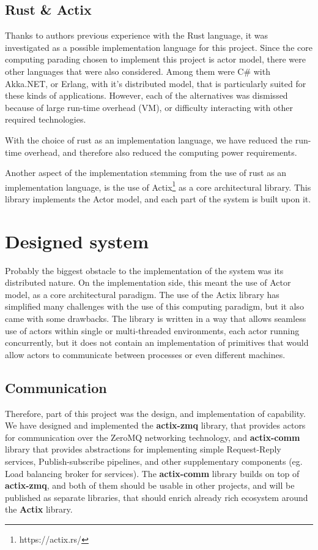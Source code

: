 \documentclass{ExcelAtFIT}
\begin{document}
    \subsection{Rust \& Actix}
    Thanks to authors previous experience with the Rust language, it was investigated as a possible implementation language for this project. Since
    the core computing parading chosen to implement this project is actor model, there were other languages that were also considered. Among them
    were C\# with Akka.NET, or Erlang, with it's distributed model, that is particularly suited for these kinds of applications. However, each of the
    alternatives was dismissed because of large run-time overhead (VM), or difficulty interacting with other required technologies.

    With the choice of rust as an implementation language, we have reduced the run-time overhead, and therefore also reduced the computing power requirements.

    Another aspect of the implementation stemming from the use of rust as an implementation language, is the use of Actix\footnote{https://actix.rs/} as a core
    architectural library. This library implements the Actor model, and each part of the system is built upon it.

    \section{Designed system}
    Probably the biggest obstacle to the implementation of the system was its distributed nature. On the implementation side, this meant the use of Actor model, as a
    core architectural paradigm. The use of the Actix library has simplified many challenges with the use of this computing paradigm, but it also
    came with some drawbacks. The library is written in a way that allows seamless use of actors within single or multi-threaded environments,
    each actor running concurrently, but it does not contain an implementation of primitives that would allow actors to communicate between processes
    or even different machines.

    \subsection{Communication}
    Therefore, part of this project was the design, and implementation of capability. We have designed and implemented the \textbf{actix-zmq} library, that
    provides actors for communication over the ZeroMQ networking technology, and \textbf{actix-comm} library that provides abstractions
    for implementing simple Request-Reply services, Publish-subscribe pipelines, and other supplementary components (eg. Load balancing broker for services).
    The \textbf{actix-comm} library builds on top of \textbf{actix-zmq}, and both of them should be usable in other projects, and will be published
    as separate libraries, that should enrich already rich ecosystem around the \textbf{Actix} library.
\end{document}
